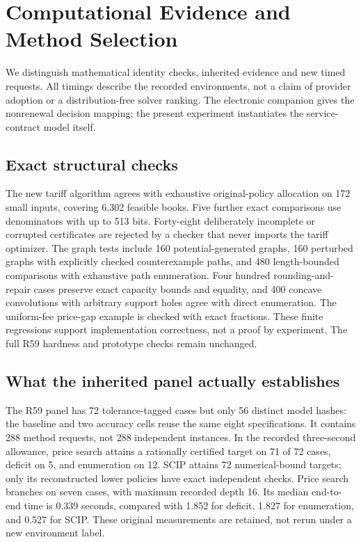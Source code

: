 \section{Computational Evidence and Method Selection}\label{sec:study59}
We distinguish mathematical identity checks, inherited evidence and new timed requests. All timings describe the recorded environments, not a claim of provider adoption or a distribution-free solver ranking. The electronic companion gives the nonrenewal decision mapping; the present experiment instantiates the service-contract model itself.

\subsection{Exact structural checks}
The new tariff algorithm agrees with exhaustive original-policy allocation on 172 small inputs, covering 6,302 feasible books. Five further exact comparisons use denominators with up to 513 bits. Forty-eight deliberately incomplete or corrupted certificates are rejected by a checker that never imports the tariff optimizer. The graph tests include 160 potential-generated graphs, 160 perturbed graphs with explicitly checked counterexample paths, and 480 length-bounded comparisons with exhaustive path enumeration. Four hundred rounding-and-repair cases preserve exact capacity bounds and equality, and 400 concave convolutions with arbitrary support holes agree with direct enumeration. The uniform-fee price-gap example is checked with exact fractions. These finite regressions support implementation correctness, not a proof by experiment. The full R59 hardness and prototype checks remain unchanged.

\subsection{What the inherited panel actually establishes}
The R59 panel has 72 tolerance-tagged cases but only 56 distinct model hashes: the baseline and two accuracy cells reuse the same eight specifications. It contains 288 method requests, not 288 independent instances. In the recorded three-second allowance, price search attains a rationally certified target on 71 of 72 cases, deficit on 5, and enumeration on 12. SCIP attains 72 numerical-bound targets; only its reconstructed lower policies have exact independent checks. Price search branches on seven cases, with maximum recorded depth 16. Its median end-to-end time is 0.339 seconds, compared with 1.852 for deficit, 1.827 for enumeration, and 0.527 for SCIP. These original measurements are retained, not rerun under a new environment label.

